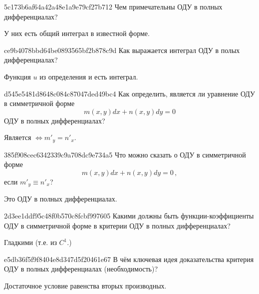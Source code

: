 \begin{note}{5c173b6af64a42a48e1a9e79cf27b712}
    Чем примечательны ОДУ в полных дифференциалах?

    \begin{cloze}{1}
        У них есть общий интеграл в известной форме.
    \end{cloze}
\end{note}

\begin{note}{ce9b4078bbd64be0893565bf2b878c9d}
    Как выражается интеграл ОДУ в полых дифференциалах?

    \begin{cloze}{1}
        Функция \({ u }\) из определения и есть интеграл.
    \end{cloze}
\end{note}

\begin{note}{d545e5481d8648c084c87047ded49bc4}
    Как определить, является ли уравнение ОДУ в симметричной форме
    \[
        m(x, y) dx + n(x, y) dy = 0
    \]
    ОДУ в полных дифференциалах?

    \begin{cloze}{1}
        Является \({ \iff m'_y = n'_x }\).
    \end{cloze}
\end{note}

\begin{note}{385f908cec6342339c9a708dc9e734a5}
    Что можно сказать о ОДУ в симметричной форме
    \[
        m(x, y) dx + n(x, y) dy = 0\,,
    \]
    если \({ m'_y \equiv n'_x }\)?

    \begin{cloze}{1}
        Это ОДУ в полных дифференциалах.
    \end{cloze}
\end{note}

\begin{note}{2d3ee1ddf95c48f0b570c8fcbf997605}
    Какими должны быть функции-коэффициенты ОДУ в симметричной форме в критерии ОДУ в полных дифференциалах?

    \begin{cloze}{1}
        Гладкими (т.е. из \({ C^{1} }\).)
    \end{cloze}
\end{note}

\begin{note}{e5db36f5f9f8404e8d347d5f20461e67}
    В чём ключевая идея доказательства критерия ОДУ в полных дифференциалах (необходимость)?

    \begin{cloze}{1}
        Достаточное условие равенства вторых производных.
    \end{cloze}
\end{note}

